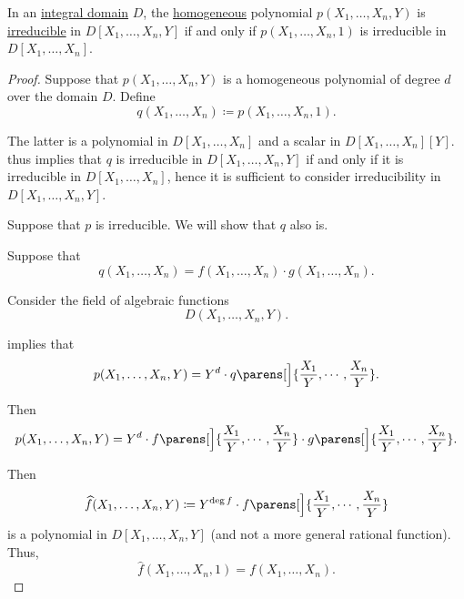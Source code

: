 \begin{proposition}\label{thm:homogeneous_polynomial_constant}
  In an \hyperref[def:integral_domain]{integral domain} \( D \), the \hyperref[def:homogeneous_polynomial]{homogeneous} polynomial \( p(X_1, \ldots, X_n, Y) \) is \hyperref[def:domain_divisibility/irreducible]{irreducible} in \( D[X_1, \ldots, X_n, Y] \) if and only if \( p(X_1, \ldots, X_n, 1) \) is irreducible in \( D[X_1, \ldots, X_n] \).
\end{proposition}
\begin{proof}
  Suppose that \( p(X_1, \ldots, X_n, Y) \) is a homogeneous polynomial of degree \( d \) over the domain \( D \). Define
  \begin{equation*}
    q(X_1, \ldots, X_n) \coloneqq p(X_1, \ldots, X_n, 1).
  \end{equation*}

  The latter is a polynomial in \( D[X_1, \ldots, X_n] \) and a scalar in \( D[X_1, \ldots, X_n][Y] \).  thus implies that \( q \) is irreducible in \( D[X_1, \ldots, X_n, Y] \) if and only if it is irreducible in \( D[X_1, \ldots, X_n] \), hence it is sufficient to consider irreducibility in \( D[X_1, \ldots, X_n, Y] \).

  \SufficiencySubProof Suppose that \( p \) is irreducible. We will show that \( q \) also is.

  Suppose that
  \begin{equation*}
    q(X_1, \ldots, X_n) = f(X_1, \ldots, X_n) \cdot g(X_1, \ldots, X_n).
  \end{equation*}

  Consider the field of algebraic functions
  \begin{equation*}
    D(X_1, \ldots, X_n, Y).
  \end{equation*}

   implies that
  \begin{equation*}
    p(X_1, \ldots, X_n, Y) = Y^d \cdot q\parens[\Big]{ \frac {X_1} Y, \cdots, \frac {X_n} Y }.
  \end{equation*}

  Then
  \begin{equation*}
    p(X_1, \ldots, X_n, Y) = Y^d \cdot f\parens[\Big]{ \frac {X_1} Y, \cdots, \frac {X_n} Y } \cdot g\parens[\Big]{ \frac {X_1} Y, \cdots, \frac {X_n} Y }.
  \end{equation*}

  Then
  \begin{equation*}
    \widehat{f}(X_1, \ldots, X_n, Y) \coloneqq Y^{\deg f} \cdot f\parens[\Big]{ \frac {X_1} Y, \cdots, \frac {X_n} Y }
  \end{equation*}
  is a polynomial in \( D[X_1, \ldots, X_n, Y] \) (and not a more general rational function). Thus,
  \begin{equation*}
    \widehat{f}(X_1, \ldots, X_n, 1) = f(X_1, \ldots, X_n).
  \end{equation*}


\end{proof}
